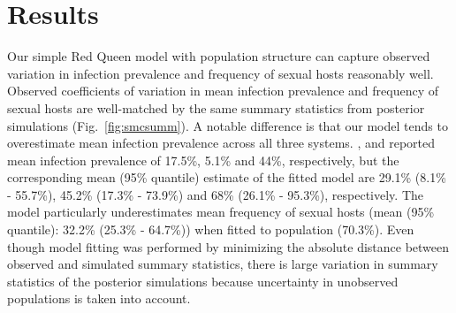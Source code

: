 \documentclass{article}\usepackage[]{graphicx}\usepackage[]{color}
\newcommand{\fref}[1]{Fig.~\ref{fig:#1}}
\begin{document}
\section{Results}

Our simple Red Queen model with population structure can capture observed variation in infection prevalence and frequency of sexual hosts reasonably well.
Observed coefficients of variation in mean infection prevalence and frequency of sexual hosts are well-matched by the same summary statistics from posterior simulations (\fref{smcsumm}).
A notable difference is that our model tends to overestimate mean infection prevalence across all three systems.
\cite{dagan2013clonal}, \cite{mckone2016fine} and \cite{vergara2014infection} reported mean infection prevalence of 17.5\%, 5.1\% and 44\%, respectively, but the corresponding mean (95\% quantile) estimate of the fitted model are 29.1\% (8.1\% - 55.7\%), 45.2\% (17.3\% - 73.9\%) and 68\% (26.1\% - 95.3\%), respectively.
The model particularly underestimates mean frequency of sexual hosts (mean (95\% quantile): 32.2\% (25.3\% - 64.7\%)) when fitted to \cite{vergara2014infection} population (70.3\%).
Even though model fitting was performed by minimizing the absolute distance between observed and simulated summary statistics, there is large variation in summary statistics of the posterior simulations because uncertainty in unobserved populations is taken into account.
\end{document}
